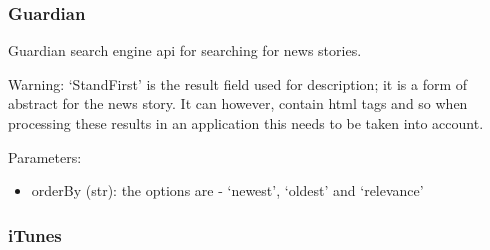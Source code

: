 \documentclass[letterpaper,10pt,english]{sphinxmanual}
\begin{document}
\subsubsection{Guardian}
\label{api3.0:guardian}

\begin{fulllineitems}
\label{api3.0:puppy.search.engine.Guardian}
Guardian search engine api for searching for news stories.

Warning: `StandFirst' is the result field used for description; it is a form of abstract for the news story. It can however, contain html tags and so 
when processing these results in an application this needs to be taken into account.

Parameters:
\begin{itemize}
\item {} 
orderBy (str): the options are - `newest', `oldest' and `relevance'

\end{itemize}

\end{fulllineitems}



\subsubsection{iTunes}
\label{api3.0:itunes}
\end{document}
